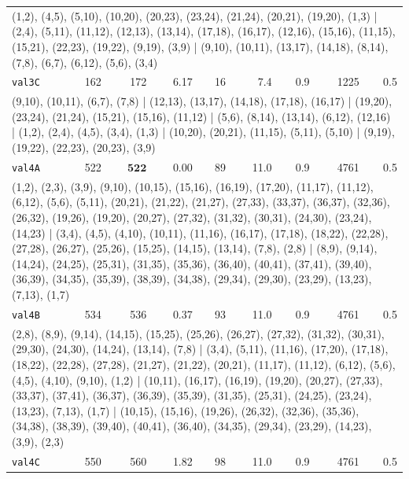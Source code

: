 \begin{landscape}
\begin{longtable}{lrrrrrrrr}
\multicolumn{9}{p{0.96\linewidth}}{\tiny\raggedright\arraybackslash (1,2), (4,5), (5,10), (10,20), (20,23), (23,24), (21,24), (20,21), (19,20), (1,3) | (2,4), (5,11), (11,12), (12,13), (13,14), (17,18), (16,17), (12,16), (15,16), (11,15), (15,21), (22,23), (19,22), (9,19), (3,9) | (9,10), (10,11), (13,17), (14,18), (8,14), (7,8), (6,7), (6,12), (5,6), (3,4)} \\[2pt]
\texttt{val3C} & 162 & 172 & 6.17 & 16 & 7.4 & 0.9 & 1225 & 0.5 \\
\multicolumn{9}{p{0.96\linewidth}}{\tiny\raggedright\arraybackslash (9,10), (10,11), (6,7), (7,8) | (12,13), (13,17), (14,18), (17,18), (16,17) | (19,20), (23,24), (21,24), (15,21), (15,16), (11,12) | (5,6), (8,14), (13,14), (6,12), (12,16) | (1,2), (2,4), (4,5), (3,4), (1,3) | (10,20), (20,21), (11,15), (5,11), (5,10) | (9,19), (19,22), (22,23), (20,23), (3,9)} \\[2pt]
\texttt{val4A} & 522 & $\mathbf{522}$ & 0.00 & 89 & 11.0 & 0.9 & 4761 & 0.5 \\
\multicolumn{9}{p{0.96\linewidth}}{\tiny\raggedright\arraybackslash (1,2), (2,3), (3,9), (9,10), (10,15), (15,16), (16,19), (17,20), (11,17), (11,12), (6,12), (5,6), (5,11), (20,21), (21,22), (21,27), (27,33), (33,37), (36,37), (32,36), (26,32), (19,26), (19,20), (20,27), (27,32), (31,32), (30,31), (24,30), (23,24), (14,23) | (3,4), (4,5), (4,10), (10,11), (11,16), (16,17), (17,18), (18,22), (22,28), (27,28), (26,27), (25,26), (15,25), (14,15), (13,14), (7,8), (2,8) | (8,9), (9,14), (14,24), (24,25), (25,31), (31,35), (35,36), (36,40), (40,41), (37,41), (39,40), (36,39), (34,35), (35,39), (38,39), (34,38), (29,34), (29,30), (23,29), (13,23), (7,13), (1,7)} \\[2pt]
\texttt{val4B} & 534 & 536 & 0.37 & 93 & 11.0 & 0.9 & 4761 & 0.5 \\
\multicolumn{9}{p{0.96\linewidth}}{\tiny\raggedright\arraybackslash (2,8), (8,9), (9,14), (14,15), (15,25), (25,26), (26,27), (27,32), (31,32), (30,31), (29,30), (24,30), (14,24), (13,14), (7,8) | (3,4), (5,11), (11,16), (17,20), (17,18), (18,22), (22,28), (27,28), (21,27), (21,22), (20,21), (11,17), (11,12), (6,12), (5,6), (4,5), (4,10), (9,10), (1,2) | (10,11), (16,17), (16,19), (19,20), (20,27), (27,33), (33,37), (37,41), (36,37), (36,39), (35,39), (31,35), (25,31), (24,25), (23,24), (13,23), (7,13), (1,7) | (10,15), (15,16), (19,26), (26,32), (32,36), (35,36), (34,38), (38,39), (39,40), (40,41), (36,40), (34,35), (29,34), (23,29), (14,23), (3,9), (2,3)} \\[2pt]
\texttt{val4C} & 550 & 560 & 1.82 & 98 & 11.0 & 0.9 & 4761 & 0.5 \\

\end{longtable}
\end{landscape}
